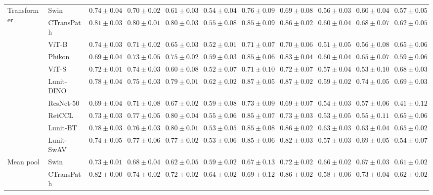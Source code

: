 \begin{tabular}{ll|cccc|c|cccc}
\cline{1-11}
\multirow[t]{10}{*}{Transformer} & Swin & $0.74 \pm 0.04$ & $0.70 \pm 0.02$ & $0.61 \pm 0.03$ & $0.54 \pm 0.04$ & $0.76 \pm 0.09$ & $0.69 \pm 0.08$ & $0.56 \pm 0.03$ & $0.60 \pm 0.04$ & $0.57 \pm 0.05$ \\
 & CTransPath & $\mathbf{0.81 \pm 0.03}$ & $\mathbf{0.80 \pm 0.01}$ & $0.80 \pm 0.03$ & $0.55 \pm 0.08$ & $0.85 \pm 0.09$ & $0.86 \pm 0.02$ & $0.60 \pm 0.04$ & $0.68 \pm 0.07$ & $0.62 \pm 0.05$ \\
 & ViT-B & $0.74 \pm 0.03$ & $0.71 \pm 0.02$ & $0.65 \pm 0.03$ & $0.52 \pm 0.01$ & $0.71 \pm 0.07$ & $0.70 \pm 0.06$ & $0.51 \pm 0.05$ & $0.56 \pm 0.08$ & $0.65 \pm 0.06$ \\
 & Phikon & $0.69 \pm 0.04$ & $0.73 \pm 0.05$ & $0.75 \pm 0.02$ & $0.59 \pm 0.03$ & $0.85 \pm 0.06$ & $0.83 \pm 0.04$ & $0.60 \pm 0.04$ & $0.65 \pm 0.07$ & $0.59 \pm 0.06$ \\
 & ViT-S & $0.72 \pm 0.01$ & $0.74 \pm 0.03$ & $0.60 \pm 0.08$ & $0.52 \pm 0.07$ & $0.71 \pm 0.10$ & $0.72 \pm 0.07$ & $0.57 \pm 0.04$ & $0.53 \pm 0.10$ & $0.68 \pm 0.03$ \\
 & Lunit-DINO & $0.78 \pm 0.04$ & $0.75 \pm 0.03$ & $0.79 \pm 0.01$ & $\mathbf{0.62 \pm 0.02}$ & $\mathbf{0.87 \pm 0.05}$ & $\mathbf{0.87 \pm 0.02}$ & $0.59 \pm 0.02$ & $\mathbf{0.74 \pm 0.05}$ & $\mathbf{0.69 \pm 0.03}$ \\
 & ResNet-50 & $0.69 \pm 0.04$ & $0.71 \pm 0.08$ & $0.67 \pm 0.02$ & $0.59 \pm 0.08$ & $0.73 \pm 0.09$ & $0.69 \pm 0.07$ & $0.54 \pm 0.03$ & $0.57 \pm 0.06$ & $0.41 \pm 0.12$ \\
 & RetCCL & $0.73 \pm 0.03$ & $0.77 \pm 0.05$ & $0.80 \pm 0.04$ & $0.55 \pm 0.06$ & $0.85 \pm 0.07$ & $0.73 \pm 0.03$ & $0.53 \pm 0.05$ & $0.55 \pm 0.11$ & $0.65 \pm 0.06$ \\
 & Lunit-BT & $0.78 \pm 0.03$ & $0.76 \pm 0.03$ & $\mathbf{0.80 \pm 0.01}$ & $0.53 \pm 0.05$ & $0.85 \pm 0.08$ & $0.86 \pm 0.02$ & $\mathbf{0.63 \pm 0.03}$ & $0.63 \pm 0.04$ & $0.65 \pm 0.02$ \\
 & Lunit-SwAV & $0.74 \pm 0.05$ & $0.77 \pm 0.06$ & $0.77 \pm 0.02$ & $0.53 \pm 0.06$ & $0.85 \pm 0.06$ & $0.82 \pm 0.03$ & $0.57 \pm 0.03$ & $0.69 \pm 0.05$ & $0.54 \pm 0.07$ \\
\cline{1-11}
\multirow[t]{10}{*}{Mean pool} & Swin & $0.73 \pm 0.01$ & $0.68 \pm 0.04$ & $0.62 \pm 0.05$ & $0.59 \pm 0.02$ & $0.67 \pm 0.13$ & $0.72 \pm 0.02$ & $\mathbf{0.66 \pm 0.02}$ & $0.67 \pm 0.03$ & $0.61 \pm 0.02$ \\
 & CTransPath & $\mathbf{0.82 \pm 0.00}$ & $0.74 \pm 0.02$ & $0.72 \pm 0.02$ & $\mathbf{0.64 \pm 0.02}$ & $0.69 \pm 0.12$ & $0.86 \pm 0.02$ & $0.58 \pm 0.06$ & $0.73 \pm 0.04$ & $0.62 \pm 0.02$ \\

\end{tabular}
